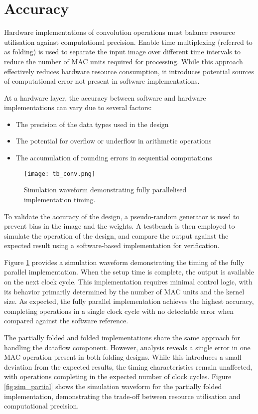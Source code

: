 \clearpage
\section{Accuracy}
Hardware implementations of convolution operations must balance resource utilisation against computational precision. Enable time multiplexing (referred to as folding) is used to separate the input image over different time intervals to reduce the number of MAC units required for processing. While this approach effectively reduces hardware resource consumption, it introduces potential sources of computational error not present in software implementations.

At a hardware layer, the accuracy between software and hardware implementations can vary due to several factors:
\begin{itemize}
    \item The precision of the data types used in the design
    \item The potential for overflow or underflow in arithmetic operations
    \item The accumulation of rounding errors in sequential computations
\end{itemize}

\begin{figure}[h]
    \centering
    \texttt{[image: tb\_conv.png]}
    \caption{Simulation waveform demonstrating fully parallelised implementation timing.}
    \label{fig:sim_parallel}
\end{figure}

To validate the accuracy of the design, a pseudo-random generator is used to prevent bias in the image and the weights. A testbench is then employed to simulate the operation of the design, and compare the output against the expected result using a software-based implementation for verification.

Figure \ref{fig:sim_parallel} provides a simulation waveform demonstrating the timing of the fully parallel implementation. When the setup time is complete, the output is available on the next clock cycle. This implementation requires minimal control logic, with its behavior primarily determined by the number of MAC units and the kernel size. As expected, the fully parallel implementation achieves the highest accuracy, completing operations in a single clock cycle with no detectable error when compared against the software reference.

The partially folded and folded implementations share the same approach for handling the dataflow component. However, analysis reveals a single error in one MAC operation present in both folding designs. While this introduces a small deviation from the expected results, the timing characteristics remain unaffected, with operations completing in the expected number of clock cycles. Figure \ref{fig:sim_partial} shows the simulation waveform for the partially folded implementation, demonstrating the trade-off between resource utilisation and computational precision.

